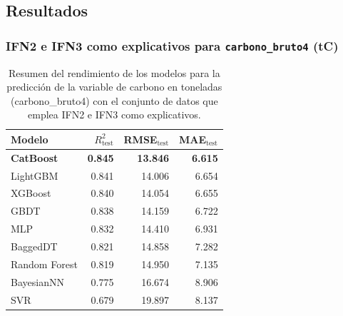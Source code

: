 \subsection{Resultados}\label{anexo:resultados}

\subsubsection{IFN2 e IFN3 como explicativos para \texttt{carbono\_bruto4} (tC)}


\begin{table}
    \centering
    \caption{Resumen del rendimiento de los modelos para la predicción de la variable de carbono en toneladas (carbono\_bruto4) con el conjunto de datos que emplea IFN2 e IFN3 como explicativos.}
    \label{tab:resultados_modelos_base_tc}
    \begin{tabular}{lrrr}
        \toprule
        Modelo            & $R^2_{\text{test}}$ & RMSE$_{\text{test}}$ & MAE$_{\text{test}}$ \\
        \midrule
        \textbf{CatBoost} & \textbf{0.845}      & \textbf{13.846}      & \textbf{6.615}      \\
        LightGBM          & 0.841               & 14.006               & 6.654               \\
        XGBoost           & 0.840               & 14.054               & 6.655               \\
        GBDT              & 0.838               & 14.159               & 6.722               \\
        MLP               & 0.832               & 14.410               & 6.931               \\
        BaggedDT          & 0.821               & 14.858               & 7.282               \\
        Random Forest     & 0.819               & 14.950               & 7.135               \\
        BayesianNN        & 0.775               & 16.674               & 8.906               \\
        SVR               & 0.679               & 19.897               & 8.137               \\
        \bottomrule
    \end{tabular}
\end{table}

